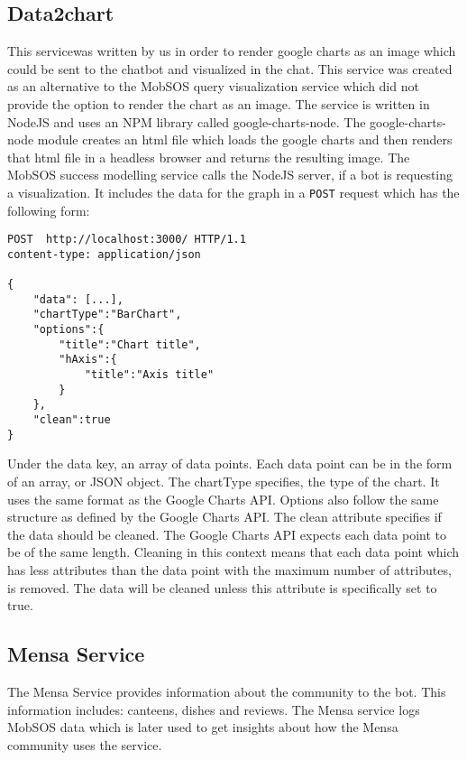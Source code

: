 \subsection{Data2chart}
This service\footnotemark was written by us in order to render google charts as an image which could be sent to the chatbot and visualized in the chat. This service was created as an alternative to the MobSOS query visualization service which did not provide the option to render the chart as an image. 
The service is written in NodeJS and uses an NPM library called google-charts-node\footnotemark.
The google-charts-node module creates an html file which loads the google charts and then renders that html file in a headless browser \footnotemark and returns the resulting image.
The MobSOS success modelling service calls the NodeJS server, if a bot is requesting a visualization. It includes the data for the graph in a \texttt{POST} request which has the following form:
\begin{lstlisting}
POST  http://localhost:3000/ HTTP/1.1
content-type: application/json

{
    "data": [...],
    "chartType":"BarChart",
    "options":{
        "title":"Chart title",
        "hAxis":{
            "title":"Axis title"
        }
    },
    "clean":true 
}
\end{lstlisting}
Under the data key, an array of data points. Each data point can be in the form of an array, or JSON object. 
The chartType specifies, the type of the chart. It uses the same format as the Google Charts API. 
Options also follow the same structure as defined by the Google Charts API.
The clean attribute specifies if the data should be cleaned. The Google Charts API expects each data point to be of the same length. Cleaning in this context means that each data point which has less attributes than the data point with the maximum number of attributes, is removed.
The data will be cleaned unless this attribute is specifically set to true.  

\subsection{Mensa Service}
The Mensa Service provides information about the community to the bot. This information includes: canteens, dishes and reviews. The Mensa service logs MobSOS data which is later used to get insights about how the Mensa community uses the service.

